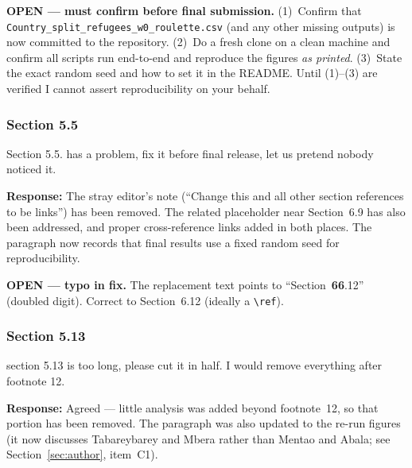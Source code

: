 \documentclass[11pt,a4paper]{article}
\begin{document}
\vspace{0.3cm}
\begin{flagbox}
\textbf{OPEN --- must confirm before final submission.} (1)~Confirm that
\texttt{Country\_split\_refugees\_w0\_roulette.csv} (and any other missing outputs) is now committed to the
repository. (2)~Do a fresh clone on a clean machine and confirm all scripts run end-to-end and reproduce the
figures \emph{as printed}. (3)~State the exact random seed and how to set it in the README. Until (1)--(3) are
verified I cannot assert reproducibility on your behalf.
\end{flagbox}

\subsubsection*{Section 5.5}

\begin{reviewbox}
Section 5.5. has a problem, fix it before final release, let us pretend nobody noticed it.
\end{reviewbox}

\textbf{Response:} The stray editor's note (``Change this and all other section references to be links'') has been
removed. The related placeholder near Section~6.9 has also been addressed, and proper cross-reference links added
in both places. The paragraph now records that final results use a fixed random seed for reproducibility.

\vspace{0.3cm}
\begin{flagbox}
\textbf{OPEN --- typo in fix.} The replacement text points to ``Section~\textbf{66}.12'' (doubled digit).
Correct to Section~6.12 (ideally a \texttt{\textbackslash ref}).
\end{flagbox}

\subsubsection*{Section 5.13}

\begin{reviewbox}
section 5.13 is too long, please cut it in half. I would remove everything after footnote 12.
\end{reviewbox}

\textbf{Response:} Agreed --- little analysis was added beyond footnote~12, so that portion has been removed.
The paragraph was also updated to the re-run figures (it now discusses Tabareybarey and Mbera rather than
Mentao and Abala; see Section~\ref{sec:author}, item~C1).
\end{document}
